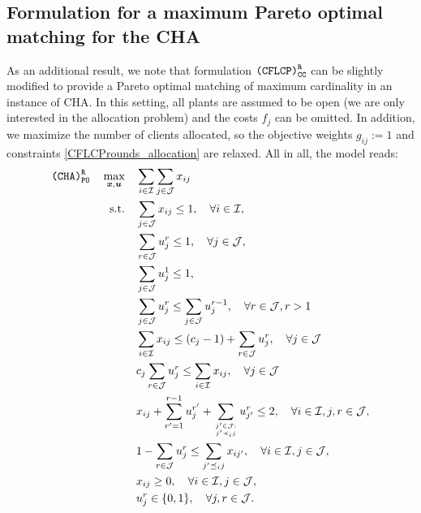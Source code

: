 \documentclass[preprint,11pt,authoryear]{elsarticle}
\def\J{\mathcal{J}}
\def\I{\mathcal{I}}
\begin{document}
\subsection{Formulation for a maximum Pareto optimal matching for the CHA}
As an additional result, we note that formulation ${\normalfont \texttt{(CFLCP)}_{\texttt{CC}}^\texttt{R}}$ can be slightly modified to provide a Pareto optimal matching of maximum cardinality in an instance of CHA. In this setting, all plants are assumed to be open (we are only interested in the allocation problem) and the costs $f_j$ can be omitted. In addition, we maximize the number of clients allocated, so the objective weights $g_{ij}:=1$ and constraints \eqref{CFLCProunds_allocation} are relaxed. All in all, the model reads:
\begin{subequations} \label{CHArounds}
\begin{align} 
\texttt{(CHA)}_{\texttt{PO}}^{\texttt{R}} \quad \max_{\boldsymbol{x}, \boldsymbol{u}} \quad & \sum_{i\in \I} \sum_{j\in \J} x_{ij}  \label{CHArounds_OF1} \\
\text{s.t.} \quad & \sum_{j\in \J} x_{ij} \le 1, \quad \forall i\in \I, \label{CHArounds_allocation} \\
& \sum_{r\in \J} u_j^r \le 1, \quad \forall j\in\J, \label{CHArounds_seagotasiseabre} \\
& \sum_{j\in \J} u_j^1 \le 1, \label{CHArounds_seagotaunacadavez1} \\
& \sum_{j\in \J} u_j^r \le \sum_{j\in \J} u^{r-1}_j, \quad \forall r\in\J, r >1  \label{CHArounds_seagotaunacadavezresto} \\
&  \sum_{i\in \I} x_{ij} \le (c_j-1) + \sum_{r\in \J} u_j^r, \quad \forall j\in\J  \label{CHArounds_uiguala0} \\
& c_j\sum_{r\in \J} u_j^r \le \sum_{i\in \I} x_{ij}, \quad \forall j\in\J  \label{CHArounds_uiguala1} \\
&  x_{ij} + \sum_{r'=1}^{r-1} u_j^{r'} + \sum_{j'\in \J:\atop j' \prec_i j} u_{j'}^r \le 2, \quad \forall i\in \I,j,r\in\J, \label{CHArounds_preferencesFull} \\
&  1 - \sum_{r\in\J} u_j^r \le \sum_{j' \preceq_i j} x_{ij'}, \quad \forall i\in \I,j\in\J, \label{CHArounds_preferencesEmpty} \\
& x_{ij} \ge 0, \quad \forall i \in \I, j \in \J,  \label{CHArounds_xbinarias} \\
& u_j^r \in \{0,1\}, \quad \forall j,r \in \J.  \label{CHArounds_binarias}
\end{align}
\end{subequations}
\end{document}

